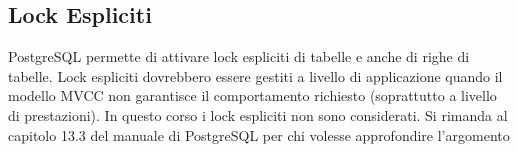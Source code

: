 \subsection{Lock Espliciti}
PostgreSQL permette di attivare lock espliciti di tabelle e anche di righe di
tabelle.
Lock espliciti dovrebbero essere gestiti a livello di applicazione quando il
modello MVCC non garantisce il comportamento richiesto (soprattutto a
livello di prestazioni).
In questo corso i lock espliciti non sono considerati.
Si rimanda al capitolo 13.3 del manuale di PostgreSQL per chi volesse
approfondire l’argomento